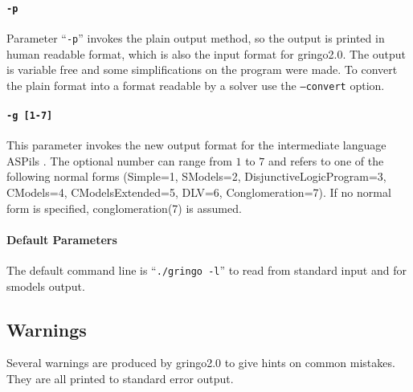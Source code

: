 \documentclass[a4paper,10pt]{article}
\begin{document}
\paragraph{\texttt{-p}}
Parameter ``\texttt{-p}'' invokes the plain output method, so the output is printed in human readable format, which is also the input format for gringo2.0. The output is variable free and some simplifications on the program were made. To convert the plain format into a format readable by a solver use the \texttt{--convert} option.
\paragraph{\texttt{-g [1-7]}}
This parameter invokes the new output format for the intermediate language ASPils \cite{gejaosscth08b}. The optional number can range from $1$ to $7$ and refers to one of the following normal forms (Simple=1, SModels=2, DisjunctiveLogicProgram=3, CModels=4, CModelsExtended=5, DLV=6, Conglomeration=7). If no normal form is specified, conglomeration(7)  is assumed.

\paragraph{Default Parameters}
The default command line is ``\texttt{./gringo -l}'' to read from standard input and for smodels output.

\subsection{Warnings}
Several warnings are produced by gringo2.0 to give hints on common mistakes.
They are all printed to standard error output.
\end{document}
